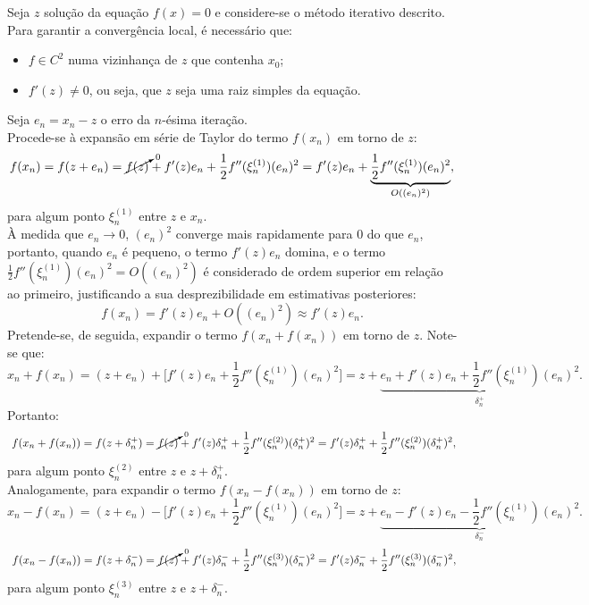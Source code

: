 Seja \(z\) solução da equação \(f(x)=0\) e considere-se o método iterativo descrito. Para garantir a convergência local, é necessário que:
\begin{itemize}
    \item \(f \in C^2\) numa vizinhança de \(z\) que contenha \(x_0\);
    \item \(f'(z) \neq 0\), ou seja, que \(z\) seja uma raiz simples da equação.
\end{itemize}
Seja \(e_n = x_n - z\) o erro da \(n\)-ésima iteração. \\
\newline
Procede-se à expansão em série de Taylor do termo \(f(x_n)\) em torno de \(z\): \\
\[f(x_n) = f(z + e_n)
= \cancelto{\scriptstyle 0}{f(z)} + f'(z) e_n + \frac{1}{2} f''(\xi_n^{(1)}) (e_n)^2
= f'(z) e_n + \underbrace{\frac{1}{2} f''(\xi_n^{(1)}) (e_n)^2}_{O((e_n)^2)},\]
para algum ponto \(\xi_n^{(1)}\) entre \(z\) e \(x_n\). \\
À medida que \(e_n \to 0\), \((e_n)^2\) converge mais rapidamente para 0 do que \(e_n\), portanto, quando \(e_n\) é pequeno, o termo \(f'(z) e_n\) domina, e o termo \(\frac{1}{2} f''(\xi_n^{(1)}) (e_n)^2 = O((e_n)^2)\) é considerado de ordem superior em relação ao primeiro, justificando a sua desprezibilidade em estimativas posteriores:
\[f(x_n) = f'(z) e_n + O((e_n)^2) \approx f'(z) e_n.\]
\newline
Pretende-se, de seguida, expandir o termo \(f(x_n + f(x_n))\) em torno de \(z\). Note-se que:
\[x_n + f(x_n)
= (z + e_n) + \big[ f'(z) e_n + \frac{1}{2} f''(\xi_n^{(1)}) (e_n)^2 \big]
= z + \underbrace{e_n + f'(z) e_n + \frac{1}{2} f''(\xi_n^{(1)}) (e_n)^2}_{\delta_n^+}.\]
Portanto:
\[\ f(x_n + f(x_n)) = f(z + \delta_n^+)
= \cancelto{\scriptstyle 0}{f(z)} + f'(z) \delta_n^+ + \frac{1}{2} f''(\xi_n^{(2)}) (\delta_n^+)^2
= f'(z) \delta_n^+ + \frac{1}{2} f''(\xi_n^{(2)}) (\delta_n^+)^2,\]
para algum ponto \(\xi_n^{(2)}\) entre \(z\) e \(z + \delta_n^+\). \\
\newline
Analogamente, para expandir o termo \(f(x_n - f(x_n))\) em torno de \(z\):
\[x_n - f(x_n)
= (z + e_n) - \big[ f'(z) e_n + \frac{1}{2} f''(\xi_n^{(1)}) (e_n)^2 \big]
= z + \underbrace{e_n - f'(z) e_n - \frac{1}{2} f''(\xi_n^{(1)}) (e_n)^2}_{\delta_n^-}.\]
\[\ f(x_n - f(x_n)) = f(z + \delta_n^-)
= \cancelto{\scriptstyle 0}{f(z)} + f'(z) \delta_n^- + \frac{1}{2} f''(\xi_n^{(3)}) (\delta_n^-)^2
= f'(z) \delta_n^- + \frac{1}{2} f''(\xi_n^{(3)}) (\delta_n^-)^2,\]
para algum ponto \(\xi_n^{(3)}\) entre \(z\) e \(z + \delta_n^-\). \\
